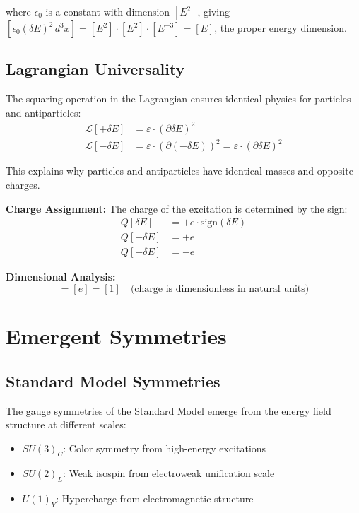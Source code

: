 \documentclass[12pt,a4paper]{report}
\begin{document}
where $\epsilon_0$ is a constant with dimension $[E^2]$, giving $[\epsilon_0 (\delta E)^2 \, d^3x] = [E^2] \cdot [E^2] \cdot [E^{-3}] = [E]$, the proper energy dimension.
	\subsection{Lagrangian Universality}
	\label{subsec:lagrangian_universality}
	
	The squaring operation in the Lagrangian ensures identical physics for particles and antiparticles:
	\begin{align}
		\mathcal{L}[+\delta E] &= \varepsilon \cdot (\partial \delta E)^2 \\
		\mathcal{L}[-\delta E] &= \varepsilon \cdot (\partial (-\delta E))^2 = \varepsilon \cdot (\partial \delta E)^2
	\end{align}
	
	This explains why particles and antiparticles have identical masses and opposite charges.
	
	\textbf{Charge Assignment:} The charge of the excitation is determined by the sign:
	\begin{align}
		Q[\delta E] &= +e \cdot \text{sign}(\delta E) \\
		Q[+\delta E] &= +e \\
		Q[-\delta E] &= -e
	\end{align}
	
	\textbf{Dimensional Analysis:}
	\begin{equation}
		[Q] = [e] = [1] \quad \text{(charge is dimensionless in natural units)}
	\end{equation}
	
	\section{Emergent Symmetries}
	\label{sec:emergent_symmetries}
	
	\subsection{Standard Model Symmetries}
	\label{subsec:standard_model_symmetries}
	
	The gauge symmetries of the Standard Model emerge from the energy field structure at different scales:
	
	\begin{itemize}
		\item \textbf{$SU(3)_C$}: Color symmetry from high-energy excitations
		\item \textbf{$SU(2)_L$}: Weak isospin from electroweak unification scale
		\item \textbf{$U(1)_Y$}: Hypercharge from electromagnetic structure
	\end{itemize}
	
\end{document}
